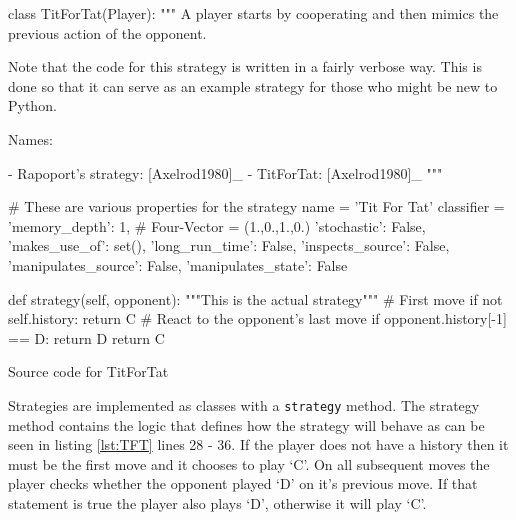 \begin{listing}[htbp!]
\begin{SourceCode}
class TitForTat(Player):
    """
    A player starts by cooperating and then mimics the previous action of the
    opponent.

    Note that the code for this strategy is written in a fairly verbose
    way. This is done so that it can serve as an example strategy for
    those who might be new to Python.

    Names:

    - Rapoport's strategy: [Axelrod1980]_
    - TitForTat: [Axelrod1980]_
    """

    # These are various properties for the strategy
    name = 'Tit For Tat'
    classifier = {
        'memory_depth': 1,  # Four-Vector = (1.,0.,1.,0.)
        'stochastic': False,
        'makes_use_of': set(),
        'long_run_time': False,
        'inspects_source': False,
        'manipulates_source': False,
        'manipulates_state': False
    }

    def strategy(self, opponent):
        """This is the actual strategy"""
        # First move
        if not self.history:
            return C
        # React to the opponent's last move
        if opponent.history[-1] == D:
            return D
        return C
\end{SourceCode}
\caption{Source code for TitForTat}
\label{lst:TFT}
\end{listing}

Strategies are implemented as classes with a \texttt{strategy} method.
The strategy method contains the logic that defines how the strategy will behave as can be seen in listing \ref{lst:TFT} lines 28 - 36.
If the player does not have a history then it must be the first move and it chooses to play `C'.
On all subsequent moves the player checks whether the opponent played `D' on it's previous move.
If that statement is true the player also plays `D', otherwise it will play `C'.
